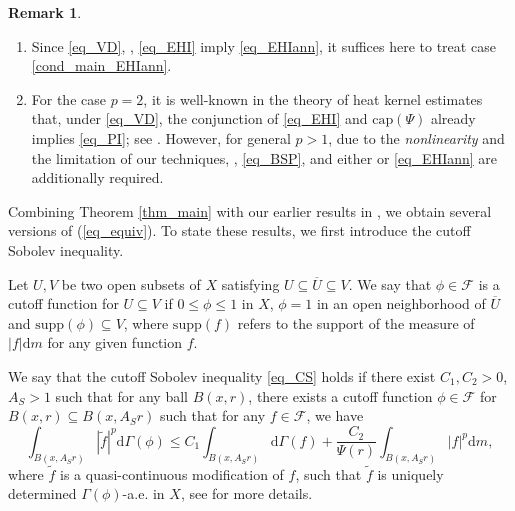 \documentclass[11pt,a4paper]{article}
\numberwithin{equation}{section}
\theoremstyle{plain}
\theoremstyle{definition}
\newtheorem{remark}[theorem]{Remark}
\begin{document}
\begin{remark}
\begin{enumerate}[label=(\arabic*)]
\item Since \ref{eq_VD}, \hyperlink{eq_LLC}{}, \ref{eq_EHI} imply \ref{eq_EHIann}, it suffices here to treat case \ref{cond_main_EHIann}.
\item For the case $p=2$, it is well-known in the theory of heat kernel estimates that, under \ref{eq_VD}, the conjunction of \ref{eq_EHI} and \hyperlink{eq_cap}{$\text{cap}(\Psi)$} already implies \ref{eq_PI}; see \cite[THEOREM 1.2]{GHL15}. However, for general $p>1$, due to the \emph{nonlinearity} and the limitation of our techniques, \hyperlink{eq_LSC}{}, \ref{eq_BSP}, and either \hyperlink{eq_LLC}{} or \ref{eq_EHIann} are additionally required.
\end{enumerate}
\end{remark}

Combining Theorem \ref{thm_main} with our earlier results in \cite{Yan25d}, we obtain several versions of (\ref{eq_equiv}). To state these results, we first introduce the cutoff Sobolev inequality.

Let $U,V$ be two open subsets of $X$ satisfying $U\subseteq\overline{U}\subseteq V$. We say that $\phi\in\mathcal{F}$ is a cutoff function for $U\subseteq V$ if $0\le\phi\le1$ in $X$, $\phi=1$ in an open neighborhood of $\overline{U}$ and $\mathrm{supp}(\phi)\subseteq V$, where $\mathrm{supp}(f)$ refers to the support of the measure of $|f|\mathrm{d} m$ for any given function $f$.

We say that the cutoff Sobolev inequality \ref{eq_CS} holds if there exist $C_{1},C_{2}>0$, $A_{S}>1$ such that for any ball $B(x,r)$, there exists a cutoff function $\phi\in\mathcal{F}$ for $B(x,r)\subseteq B(x,A_Sr)$ such that for any $f\in\mathcal{F}$, we have
\begin{equation*}\label{eq_CS}\tag*{CS($\Psi$)}
\int_{B(x,A_{S}r)}|\widetilde{f}|^p\mathrm{d}\Gamma(\phi)\le C_{1}\int_{B(x,A_{S}r)}\mathrm{d}\Gamma(f)+\frac{C_{2}}{\Psi(r)}\int_{B(x,A_{S}r)}|f|^p\mathrm{d} m,
\end{equation*}
where $\widetilde{f}$ is a quasi-continuous modification of $f$, such that $\widetilde{f}$ is uniquely determined $\Gamma(\phi)$-a.e. in $X$, see \cite[Section 8]{Yan25a} for more details.

\end{document}
